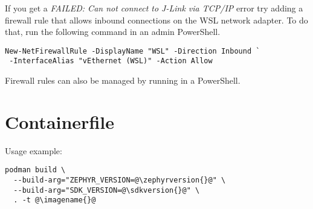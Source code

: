 \begin{infobox}
  If you get a \emph{FAILED: Can not connect to J-Link via TCP/IP} error try
  adding a firewall rule that allows inbound connections on the WSL network
  adapter. To do that, run the following command in an admin PowerShell.

  \begin{lstlisting}
New-NetFirewallRule -DisplayName "WSL" -Direction Inbound `
 -InterfaceAlias "vEthernet (WSL)" -Action Allow
\end{lstlisting}

  Firewall rules can also be managed by running  in a PowerShell.
\end{infobox}

\newpage

\fancyfoot{}

\section{Containerfile}\label{containerfile}



Usage example:

\begin{lstlisting}
podman build \
  --build-arg="ZEPHYR_VERSION=@\zephyrversion{}@" \
  --build-arg="SDK_VERSION=@\sdkversion{}@" \
  . -t @\imagename{}@
\end{lstlisting}



